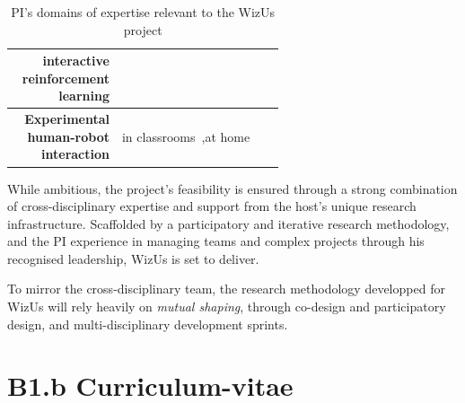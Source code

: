 \documentclass[11pt,a4paper]{report}
\newcommand{\project}{WizUs\xspace}
\newcommand{\eu}[1]{}
\begin{document}
\begin{table}[h]
\begin{tabular}{rp{0.6\linewidth}}
        \midrule
        interactive reinforcement learning & \small \cite{senft2017leveraging,senft2017supervised, senft2019teaching} \\
        \midrule
        \textbf{Experimental human-robot interaction} & \small in
        classrooms~\cite{hood2015when, lemaignan2016learning, jacq2016building,
        baxter2015wider,kennedy2016cautious,senft2018robots},\newline at home~\cite{mondada2015ranger}\\
        \bottomrule
    \end{tabular}
    \caption{\small PI's domains of expertise relevant to the \project project}
    \label{pi-expertise}
\end{table}




While ambitious, the project's feasibility is ensured through a strong
combination of cross-disciplinary expertise and support from the host's unique
research infrastructure. Scaffolded by a participatory and iterative research
methodology, and the PI experience in managing teams and complex projects
through his recognised leadership, \project is set to deliver.

To mirror the cross-disciplinary team, the research methodology developped for
\project will rely heavily on \emph{mutual shaping}, through co-design and
participatory design, and multi-disciplinary development sprints.





\newpage

\printbibliography





\newpage

\chapter{B1.b Curriculum-vitae}\label{the-principal-investigator}

\end{document}
